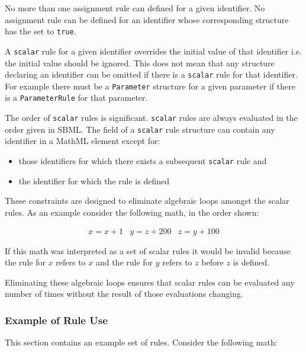 \documentclass[10pt,twocolumntoc]{cekarticle}
\begin{document}
No more than one assignment rule can defined for a given
identifier.  No assignment rule can be defined for an identifier
whose corresponding structure has the  set to
\texttt{true}.

A \texttt{scalar} rule for a given identifier overrides the
initial value of that identifier i.e. the initial value should be
ignored. This does not mean that any structure declaring an
identifier can be omitted if there is a \texttt{scalar} rule for
that identifier.  For example there must be a \texttt{Parameter}
structure for a given parameter if there is a
\texttt{ParameterRule} for that parameter.

The order of \texttt{scalar} rules is significant. \texttt{scalar}
rules are always evaluated in the order given in SBML.  The
 field of a \texttt{scalar} rule structure can
contain any identifier in a MathML  element except for:
\begin{itemize}

\item those identifiers for which there exists a subsequent
\texttt{scalar} rule and

\item the identifier for which the rule is defined

\end{itemize}
These constraints are designed to eliminate algebraic loops
amongst the scalar rules.  As an example consider the following math, in the order shown:

\begin{equation*}
  \begin{array}{lll}
    x = x + 1 & y = z + 200 & z = y + 100\\ \\[-4pt]
  \end{array}
\end{equation*}
If this math was interpreted as a set of scalar rules it would be invalid because the rule for $x$ refers to $x$ and the rule for $y$ refers to $z$ before $z$ is defined.

Eliminating these algebraic loops ensures that scalar rules can be evaluated any number of times without the result of those evaluations changing.

\subsubsection{Example of Rule Use}

This section contains an example set of rules.  Consider the 
following math:
\end{document}
